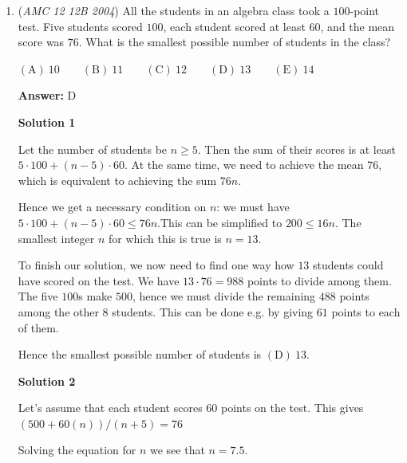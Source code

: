 \begin{enumerate}
 From the \href{https://artofproblemsolving.com/wiki/index.php?title=Pythagorean\_Theorem}{Pythagorean Theorem} for the right triangle $OXZ$ we have $a^2 + c^2 = b^2$, hence $b^2-c^2=a^2$ and thus the shaded area is $\boxed{\mathrm{(A)\ }\pi a^2}$.

 



\textbf{Solution 2}

Set $c=0,$ then the shaded area is just the area of a circle with radius $a,$ which is $\boxed{\mathrm{(A)\ }\pi a^2}$.

 


	\item (\textit{AMC 12 12B 2004}) All the students in an algebra class took a $100$-point test. Five students scored $100$, each student scored at least $60$, and the mean score was $76$. What is the smallest possible number of students in the class?


 $\mathrm{(A)}\ 10 \qquad \mathrm{(B)}\ 11 \qquad \mathrm{(C)}\ 12 \qquad \mathrm{(D)}\ 13 \qquad \mathrm{(E)}\ 14$

 \textbf{Answer: }D



\textbf{Solution 1}

Let the number of students be $n\geq 5$. Then the sum of their scores is at least $5\cdot 100 + (n-5)\cdot 60$. At the same time, we need to achieve the mean $76$, which is equivalent to achieving the sum $76n$.

 Hence we get a necessary condition on $n$: we must have $5\cdot 100 + (n-5)\cdot 60 \leq 76n$.This can be simplified to $200 \leq 16n$. The smallest integer $n$ for which this is true is $n=13$.

 To finish our solution, we now need to find one way how $13$ students could have scored on the test. We have $13\cdot 76 = 988$ points to divide among them. The five $100$s make $500$, hence we must divide the remaining $488$ points among the other $8$ students. This can be done e.g. by giving $61$ points to each of them. 

 Hence the smallest possible number of students is $\boxed{\mathrm{(D)}\ 13}$.

 



\textbf{Solution 2}

Let's assume that each student scores 60 points on the test. This gives$(500 + 60(n))/(n+5) = 76$

 Solving the equation for $n$ we see that $n = 7.5$.


\end{enumerate}
